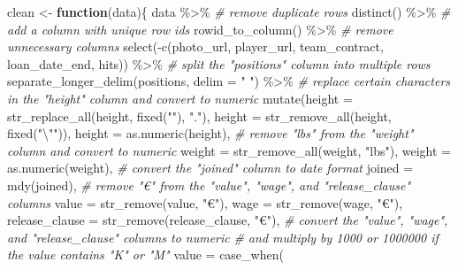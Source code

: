 \documentclass[
]{article}
\newenvironment{Shaded}{\begin{snugshade}}{\end{snugshade}}
\newcommand{\AttributeTok}[1]{\textcolor[rgb]{0.77,0.63,0.00}{#1}}
\newcommand{\CommentTok}[1]{\textcolor[rgb]{0.56,0.35,0.01}{\textit{#1}}}
\newcommand{\ControlFlowTok}[1]{\textcolor[rgb]{0.13,0.29,0.53}{\textbf{#1}}}
\newcommand{\FunctionTok}[1]{\textcolor[rgb]{0.00,0.00,0.00}{#1}}
\newcommand{\NormalTok}[1]{#1}
\newcommand{\OtherTok}[1]{\textcolor[rgb]{0.56,0.35,0.01}{#1}}
\newcommand{\SpecialCharTok}[1]{\textcolor[rgb]{0.00,0.00,0.00}{#1}}
\newcommand{\StringTok}[1]{\textcolor[rgb]{0.31,0.60,0.02}{#1}}
\begin{document}
\begin{Shaded}
\begin{Highlighting}[]
\NormalTok{clean }\OtherTok{\textless{}{-}} \ControlFlowTok{function}\NormalTok{(data)\{}
\NormalTok{  data }\SpecialCharTok{\%\textgreater{}\%} 
  \CommentTok{\# remove duplicate rows}
  \FunctionTok{distinct}\NormalTok{() }\SpecialCharTok{\%\textgreater{}\%} 
  \CommentTok{\# add a column with unique row ids}
  \FunctionTok{rowid\_to\_column}\NormalTok{() }\SpecialCharTok{\%\textgreater{}\%} 
  \CommentTok{\# remove unnecessary columns}
  \FunctionTok{select}\NormalTok{(}\SpecialCharTok{{-}}\FunctionTok{c}\NormalTok{(photo\_url, player\_url, team\_contract, loan\_date\_end, hits)) }\SpecialCharTok{\%\textgreater{}\%} 
  \CommentTok{\# split the "positions" column into multiple rows}
  \FunctionTok{separate\_longer\_delim}\NormalTok{(positions, }\AttributeTok{delim =} \StringTok{" "}\NormalTok{) }\SpecialCharTok{\%\textgreater{}\%} 
  \CommentTok{\# replace certain characters in the "height" column and convert to numeric}
  \FunctionTok{mutate}\NormalTok{(}\AttributeTok{height =} \FunctionTok{str\_replace\_all}\NormalTok{(height, }\FunctionTok{fixed}\NormalTok{(}\StringTok{"\textquotesingle{}"}\NormalTok{), }\StringTok{"."}\NormalTok{),}
         \AttributeTok{height =} \FunctionTok{str\_remove\_all}\NormalTok{(height, }\FunctionTok{fixed}\NormalTok{(}\StringTok{"}\SpecialCharTok{\textbackslash{}"}\StringTok{"}\NormalTok{)),}
         \AttributeTok{height =} \FunctionTok{as.numeric}\NormalTok{(height),}
         \CommentTok{\# remove "lbs" from the "weight" column and convert to numeric}
         \AttributeTok{weight =} \FunctionTok{str\_remove\_all}\NormalTok{(weight, }\StringTok{"lbs"}\NormalTok{),}
         \AttributeTok{weight =} \FunctionTok{as.numeric}\NormalTok{(weight),}
         \CommentTok{\# convert the "joined" column to date format}
         \AttributeTok{joined =} \FunctionTok{mdy}\NormalTok{(joined),}
         \CommentTok{\# remove "€" from the "value", "wage", and "release\_clause" columns}
         \AttributeTok{value =} \FunctionTok{str\_remove}\NormalTok{(value, }\StringTok{"€"}\NormalTok{),}
         \AttributeTok{wage =} \FunctionTok{str\_remove}\NormalTok{(wage, }\StringTok{"€"}\NormalTok{),}
         \AttributeTok{release\_clause =} \FunctionTok{str\_remove}\NormalTok{(release\_clause, }\StringTok{"€"}\NormalTok{),}
         \CommentTok{\# convert the "value", "wage", and "release\_clause" columns to numeric}
         \CommentTok{\# and multiply by 1000 or 1000000 if the value contains "K" or "M"}
         \AttributeTok{value =} \FunctionTok{case\_when}\NormalTok{(}

\end{Highlighting}
\end{Shaded}
\end{document}
